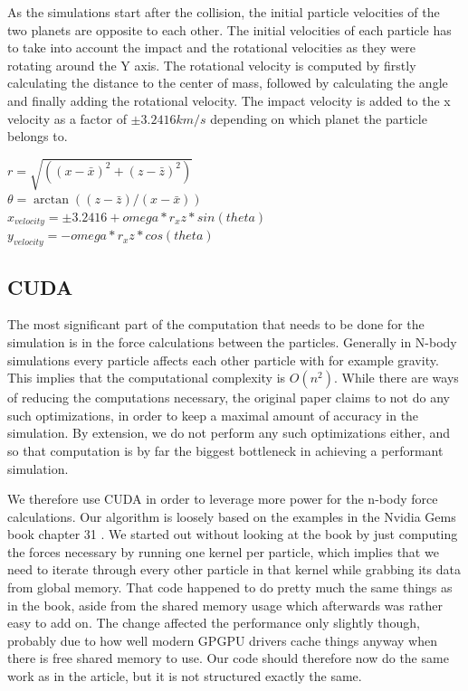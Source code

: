 \documentclass[a4paper]{article}
\begin{document}
As the simulations start after the collision, the initial particle velocities of the two planets are opposite to each other. 
The initial velocities of each particle has to take into account the impact and the rotational velocities as they were rotating around the Y axis. 
The rotational velocity is computed by firstly calculating the distance to the center of mass, followed by calculating the angle and finally adding the rotational velocity. 
The impact velocity is added to the x velocity as a factor of $\pm 3.2416 km/s$ depending on which planet the particle belongs to.

\begin{center}
$r = \sqrt{((x - \bar{x})^2 + (z - \bar{z})^2)}$ \\
$\theta = \arctan((z - \bar{z})/(x - \bar{x}))$ \\
$x_{velocity} = \pm 3.2416 + omega*r_xz*sin(theta)$ \\
$y_{velocity} = -omega*r_xz*cos(theta)$ \\
\end{center}


\subsection{CUDA}

The most significant part of the computation that needs to be done for the simulation is in the force calculations between the particles.
Generally in N-body simulations every particle affects each other particle with for example gravity.
This implies that the computational complexity is $O(n^2)$.
While there are ways of reducing the computations necessary, the original paper claims to not do any such optimizations, in order to keep a maximal amount of accuracy in the simulation.
By extension, we do not perform any such optimizations either, and so that computation is by far the biggest bottleneck in achieving a performant simulation.

We therefore use CUDA in order to leverage more power for the n-body force calculations.
Our algorithm is loosely based on the examples in the Nvidia Gems book chapter 31 \cite{nvidia_gems}.
We started out without looking at the book by just computing the forces necessary by running one kernel per particle, which implies that we need to iterate through every other particle in that kernel while grabbing its data from global memory.
That code happened to do pretty much the same things as in the book, aside from the shared memory usage which afterwards was rather easy to add on.
The change affected the performance only slightly though, probably due to how well modern GPGPU drivers cache things anyway when there is free shared memory to use.
Our code should therefore now do the same work as in the article, but it is not structured exactly the same.
\end{document}
